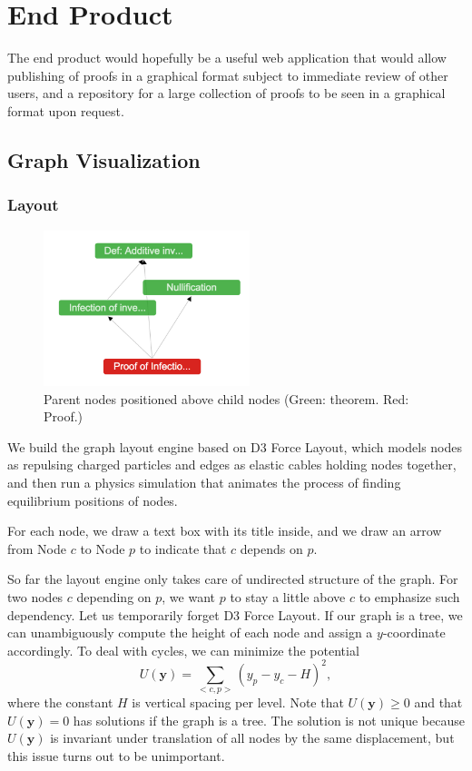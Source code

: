 \documentclass{acm_proc_article-sp}
\begin{document}
\section{End Product}
The end product would hopefully be a useful web application that would
allow publishing of proofs in a graphical format subject to immediate review
of other users, and a repository for a large collection of proofs to be
seen in a graphical format upon request.
\subsection{Graph Visualization}
\subsubsection{Layout}
\begin{figure}[h!]
\centering
\includegraphics[width=6cm]{layout_1.png}
\caption{Parent nodes positioned above child nodes (Green: theorem. Red: Proof.)}
\end{figure}
We build the graph layout engine based on D3 Force Layout,
which models nodes as repulsing charged particles and edges as elastic cables holding nodes together, 
and then run a physics simulation that animates the process of finding equilibrium positions of nodes.

For each node, we draw a text box with its title inside,
and we draw an arrow from Node $c$ to Node $p$ to indicate that $c$ depends on $p$.

So far the layout engine only takes care of undirected structure of the graph. 
For two nodes $c$ depending on $p$, we want $p$ to stay a little above $c$ to emphasize such dependency.
Let us temporarily forget D3 Force Layout.
If our graph is a tree, we can unambiguously compute the height of each node and assign a $y$-coordinate accordingly. 
To deal with cycles, 
we can minimize the potential
\begin{equation}
U(\mathbf{y}) = \sum_{<c,p>}\left(y_p-y_c-H\right)^2,
\end{equation}
where the constant $H$ is vertical spacing per level.
Note that $U(\mathbf{y})\geq0$ and that $U(\mathbf{y})=0$ has solutions if the graph is a tree. 
The solution is not unique because $U(\mathbf{y})$ is invariant under translation of all nodes by the same displacement, 
but this issue turns out to be unimportant.
\end{document}
